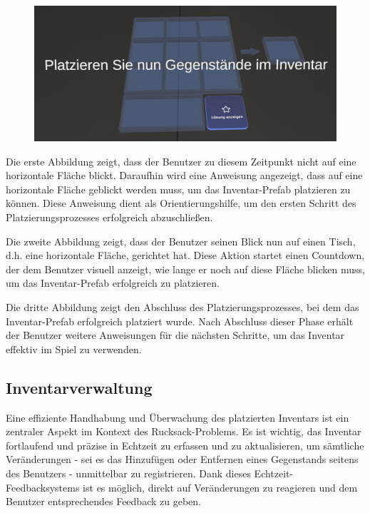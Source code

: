 \begin{figure}[H]
\begin{minipage}[b]{0.30\textwidth}
        \centering
        \includegraphics[width=\textwidth]{images/schrittdrei.png}
        \label{fig:drei}
    \end{minipage}
\end{figure}

Die erste Abbildung zeigt, dass der Benutzer zu diesem Zeitpunkt nicht auf eine horizontale Fläche blickt. Daraufhin wird
eine Anweisung angezeigt, dass auf eine horizontale Fläche geblickt werden muss, um das Inventar-Prefab platzieren zu
können. Diese Anweisung dient als Orientierungshilfe, um den ersten Schritt des Platzierungsprozesses erfolgreich abzuschließen.

Die zweite Abbildung zeigt, dass der Benutzer seinen Blick nun auf einen Tisch, d.h. eine horizontale Fläche, gerichtet hat.
Diese Aktion startet einen Countdown, der dem Benutzer visuell anzeigt, wie lange er noch auf diese Fläche blicken muss,
um das Inventar-Prefab erfolgreich zu platzieren.

Die dritte Abbildung zeigt den Abschluss des Platzierungsprozesses, bei dem das Inventar-Prefab erfolgreich platziert wurde.
Nach Abschluss dieser Phase erhält der Benutzer weitere Anweisungen für die nächsten Schritte, um das Inventar effektiv im
Spiel zu verwenden.

\subsection{Inventarverwaltung}
Eine effiziente Handhabung und Überwachung des platzierten Inventars ist ein zentraler Aspekt im Kontext des Rucksack-Problems.
Es ist wichtig, das Inventar fortlaufend und präzise in Echtzeit zu erfassen und zu aktualisieren, um sämtliche Veränderungen
- sei es das Hinzufügen oder Entfernen eines Gegenstands seitens des Benutzers - unmittelbar zu registrieren. Dank dieses
Echtzeit-Feedbacksystems ist es möglich, direkt auf Veränderungen zu reagieren und dem Benutzer entsprechendes Feedback zu geben.

